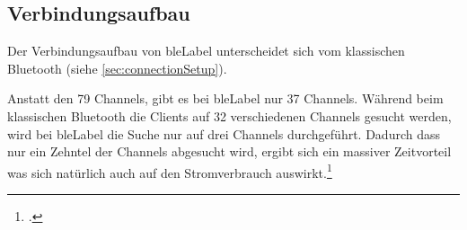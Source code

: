 


\subsection{Verbindungsaufbau}
\label{subsec:bleConnectionSetup}
Der Verbindungsaufbau von \gls{bleLabel} unterscheidet sich vom klassischen Bluetooth (siehe \cref{sec:connectionSetup}).

Anstatt den 79 Channels, gibt es bei \gls{bleLabel} nur 37 Channels. Während beim klassischen Bluetooth die Clients auf 32 verschiedenen Channels gesucht werden, wird bei \gls{bleLabel} die Suche nur auf drei Channels durchgeführt.
Dadurch dass nur ein Zehntel der Channels abgesucht wird, ergibt sich ein massiver Zeitvorteil was sich natürlich auch auf den Stromverbrauch auswirkt.\footcite[][3]{ti_whitepaper_2015-05-08}


